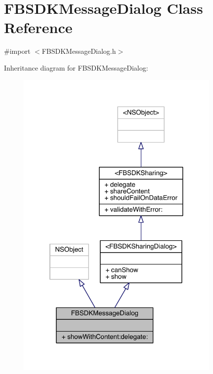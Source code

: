 \hypertarget{interface_f_b_s_d_k_message_dialog}{\section{F\-B\-S\-D\-K\-Message\-Dialog Class Reference}
\label{interface_f_b_s_d_k_message_dialog}
}


{\ttfamily \#import $<$F\-B\-S\-D\-K\-Message\-Dialog.\-h$>$}



Inheritance diagram for F\-B\-S\-D\-K\-Message\-Dialog\-:
\nopagebreak
\begin{figure}[H]
\begin{center}
\leavevmode
\includegraphics[width=281pt]{interface_f_b_s_d_k_message_dialog__inherit__graph}
\end{center}
\end{figure}


